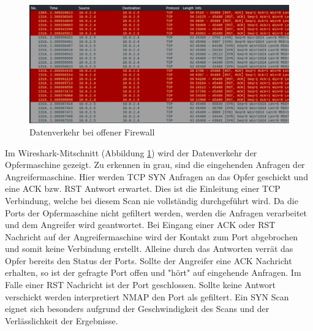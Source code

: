 \begin{figure}
	\includegraphics[width=\linewidth]{img/ws_firewall-open.png}
	\caption{Datenverkehr bei offener Firewall}
	\label{fig:ws_firewall_open}
\end{figure}

Im Wireshark-Mitschnitt (Abbildung \ref{fig:ws_firewall_open}) wird der Datenverkehr der Opfermaschine gezeigt. Zu erkennen in grau, sind die eingehenden Anfragen der Angreifermaschine. Hier werden TCP SYN Anfragen an das Opfer geschickt und eine ACK bzw. RST Antwort erwartet. Dies ist die Einleitung einer TCP Verbindung, welche bei diesem Scan nie vollständig durchgeführt wird. Da die Ports der Opfermaschine nicht gefiltert werden, werden die Anfragen verarbeitet und dem Angreifer wird geantwortet. Bei Eingang einer ACK oder RST Nachricht auf der Angreifermaschine wird der Kontakt zum Port abgebrochen und somit keine Verbindung erstellt. Alleine durch das Antworten verrät das Opfer bereits den Status der Ports. Sollte der Angreifer eine ACK Nachricht erhalten, so ist der gefragte Port offen und "hört" auf eingehende Anfragen. Im Falle einer RST Nachricht ist der Port geschlossen.
 Sollte keine Antwort verschickt werden interpretiert NMAP den Port als gefiltert. Ein SYN Scan eignet sich besonders aufgrund der Geschwindigkeit des Scans und der Verlässlichkeit der Ergebnisse.

